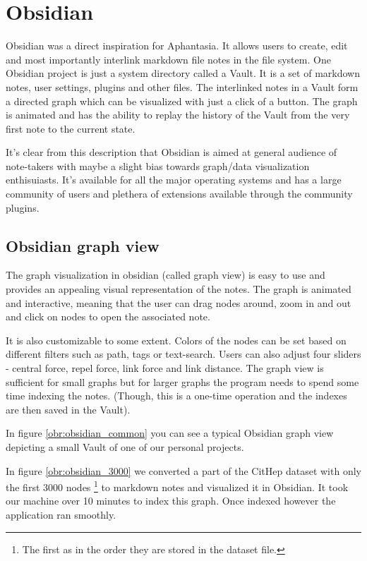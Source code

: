 \section{Obsidian}

Obsidian \cite{obsidian_website} was a direct inspiration for Aphantasia. It allows users to create, edit and most importantly interlink markdown file notes in the file system.
One Obsidian project is just a system directory called a Vault. It is a set of markdown notes, user settings, plugins and other files.
The interlinked notes in a Vault form a directed graph which can be visualized with just a click of a button.
The graph is animated and has the ability to replay the history of the Vault from the very first note to the current state.

It's clear from this description that Obsidian is aimed at general audience of note-takers 
with maybe a slight bias towards graph/data visualization enthisuiasts.
It's available for all the major operating systems and has a large community of users and plethera of extensions available through the
community plugins.

\subsection*{Obsidian graph view}

The graph visualization in obsidian (called graph view) is easy to use and provides an appealing visual representation of the notes.
The graph is animated and interactive, meaning that the user can drag nodes around, zoom in and out and click on nodes to open the associated note.

It is also customizable to some extent.
Colors of the nodes can be set based on different filters such as path, tags or text-search.
Users can also adjust four sliders - central force, repel force, link force and link distance.
The graph view is sufficient for small graphs but for larger graphs the program needs to spend some time indexing the notes.
(Though, this is a one-time operation and the indexes are then saved in the Vault).

In figure \ref{obr:obsidian_common} you can see a typical Obsidian graph view depicting a small Vault of one of our personal projects.

In figure \ref{obr:obsidian_3000} we converted a part of the CitHep dataset with only the first 3000 nodes
\footnote{The first as in the order they are stored in the dataset file.}
to markdown notes and visualized it in Obsidian.
It took our machine over 10 minutes to index this graph.
Once indexed however the application ran smoothly.

